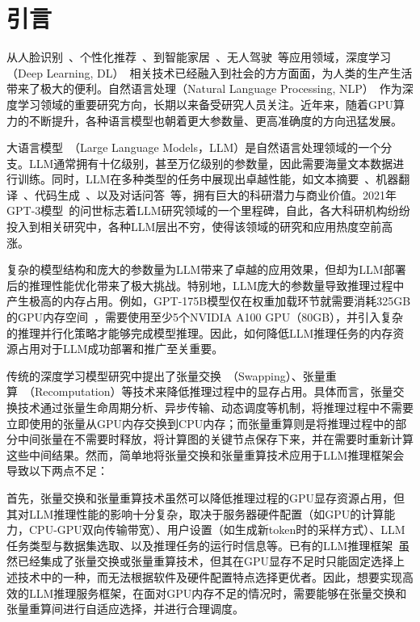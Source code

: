 \section{引言}

从人脸识别~\cite{Face-Recognition}、个性化推荐~\cite{Personal-Recommendation}、到智能家居~\cite{Smart-Home}、无人驾驶~\cite{Self-Driving}等应用领域，深度学习（Deep Learning, DL）~\cite{Deep-Learning}相关技术已经融入到社会的方方面面，为人类的生产生活带来了极大的便利。自然语言处理（Natural Language Processing, NLP）~\cite{NLP}作为深度学习领域的重要研究方向，长期以来备受研究人员关注。近年来，随着GPU算力的不断提升，各种语言模型也朝着更大参数量、更高准确度的方向迅猛发展。

大语言模型~\cite{LLM}（Large Language Models，LLM）是自然语言处理领域的一个分支。LLM通常拥有十亿级别，甚至万亿级别的参数量，因此需要海量文本数据进行训练。同时，LLM在多种类型的任务中展现出卓越性能，如文本摘要~\cite{Text-Summarization}、机器翻译~\cite{Machine-Translation}、代码生成~\cite{Code-Generation}、以及对话问答~\cite{Question-Answer}等，拥有巨大的科研潜力与商业价值。2021年GPT-3模型~\cite{Text-Summarization, GPT3}的问世标志着LLM研究领域的一个里程碑，自此，各大科研机构纷纷投入到相关研究中，各种LLM层出不穷，使得该领域的研究和应用热度空前高涨。

复杂的模型结构和庞大的参数量为LLM带来了卓越的应用效果，但却为LLM部署后的推理性能优化带来了极大挑战。特别地，LLM庞大的参数量导致推理过程中产生极高的内存占用。例如，GPT-175B模型仅在权重加载环节就需要消耗325GB的GPU内存空间~\cite{GPT-175B资源消耗}，需要使用至少5个NVIDIA A100 GPU（80GB），并引入复杂的推理并行化策略才能够完成模型推理。因此，如何降低LLM推理任务的内存资源占用对于LLM成功部署和推广至关重要。

传统的深度学习模型研究中提出了张量交换~\cite{Swapping}（Swapping）、张量重算~\cite{Recomputation}（Recomputation）等技术来降低推理过程中的显存占用。具体而言，张量交换技术通过张量生命周期分析、异步传输、动态调度等机制，将推理过程中不需要立即使用的张量从GPU内存交换到CPU内存；而张量重算则是将推理过程中的部分中间张量在不需要时释放，将计算图的关键节点保存下来，并在需要时重新计算这些中间结果。然而，简单地将张量交换和张量重算技术应用于LLM推理框架会导致以下两点不足：

首先，张量交换和张量重算技术虽然可以降低推理过程的GPU显存资源占用，但其对LLM推理性能的影响十分复杂，取决于服务器硬件配置（如GPU的计算能力，CPU-GPU双向传输带宽）、用户设置（如生成新token时的采样方式）、LLM任务类型与数据集选取、以及推理任务的运行时信息等。已有的LLM推理框架~\cite{Swapping, vLLM, ORCA}虽然已经集成了张量交换或张量重算技术，但其在GPU显存不足时只能固定选择上述技术中的一种，而无法根据软件及硬件配置特点选择更优者。因此，想要实现高效的LLM推理服务框架，在面对GPU内存不足的情况时，需要能够在张量交换和张量重算间进行自适应选择，并进行合理调度。

